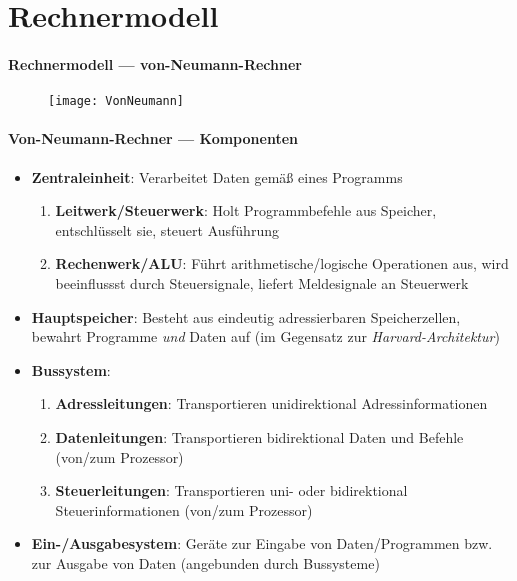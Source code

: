\section{Rechnermodell}
\label{sec:rechnermodell}

\paragraph{Rechnermodell --- von-Neumann-Rechner}
\begin{figure}[ht]
  \centering
  \texttt{[image: VonNeumann]}
  \label{VonNeumann}
\end{figure}

\paragraph{Von-Neumann-Rechner --- Komponenten}
\begin{itemize}
	\item \textbf{Zentraleinheit}: Verarbeitet Daten gemäß eines Programms
	\begin{enumerate}
		\item \textbf{Leitwerk/Steuerwerk}: Holt Programmbefehle aus Speicher, entschlüsselt sie, steuert Ausführung
		\item \textbf{Rechenwerk/ALU}: Führt arithmetische/logische Operationen aus, wird beeinflussst durch Steuersignale, liefert Meldesignale an Steuerwerk
	\end{enumerate}
	\item \textbf{Hauptspeicher}: Besteht aus eindeutig adressierbaren Speicherzellen, bewahrt Programme \emph{und} Daten auf (im Gegensatz zur \emph{Harvard-Architektur})
	\item \textbf{Bussystem}:
	\begin{enumerate}
		\item \textbf{Adressleitungen}: Transportieren unidirektional Adressinformationen
		\item \textbf{Datenleitungen}: Transportieren bidirektional Daten und Befehle (von/zum Prozessor)
		\item \textbf{Steuerleitungen}: Transportieren uni- oder bidirektional Steuerinformationen (von/zum Prozessor)
	\end{enumerate}
	\item \textbf{Ein-/Ausgabesystem}: Geräte zur Eingabe von Daten/Programmen bzw. zur Ausgabe von Daten (angebunden durch Bussysteme)
\end{itemize}

